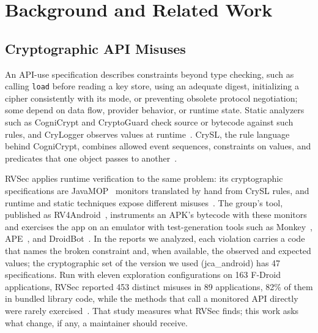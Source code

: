 \documentclass[conference]{IEEEtran}
\begin{document}
\section{Background and Related Work}
\label{sec:background}

\subsection{Cryptographic API Misuses}

An API-use specification describes constraints beyond type checking, such as
calling \texttt{load} before reading a key store, using an adequate digest,
initializing a cipher consistently with its mode, or preventing obsolete
protocol negotiation; some depend on data flow, provider behavior, or runtime
state. Static analyzers such as CogniCrypt
and CryptoGuard check source or bytecode against such rules, and CryLogger
observes values at
runtime~\cite{krueger2017cognicrypt,rahaman2019cryptoguard,piccolboni2021crylogger}.
CrySL, the rule language behind CogniCrypt, combines allowed event sequences,
constraints on values, and predicates that one object passes to
another~\cite{krueger2021crysl}.

RVSec applies runtime verification to the same problem: its cryptographic
specifications are JavaMOP~\cite{jin2012javamop} monitors translated by hand
from CrySL rules, and runtime and static techniques expose different
misuses~\cite{torres2023runtime}. The group's tool, published as
RV4Android~\cite{costa2026rv4android}, instruments an APK's bytecode with these
monitors and exercises the app on an emulator with test-generation tools such
as Monkey~\cite{androidmonkey}, APE~\cite{gu2019ape}, and
DroidBot~\cite{li2017droidbot}. In the reports we analyzed, each violation
carries a code that names the broken constraint and, when available, the
observed and expected values; the cryptographic set of the version we used
(jca\_android) has 47 specifications. Run with eleven exploration
configurations on 163 F-Droid~\cite{fdroid} applications, RVSec reported 453 distinct misuses in 89 applications, 82\% of
them in bundled library code, while the methods that call a monitored API
directly were rarely exercised~\cite{costa2026effectiveness}. That study
measures what RVSec finds; this work asks what change, if any, a maintainer
should receive.
\end{document}
